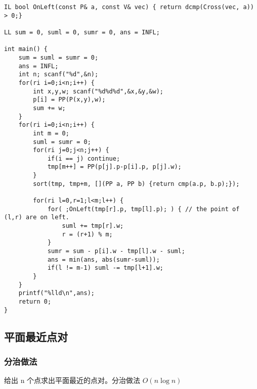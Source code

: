 \documentclass[UTF8]{ctexart}
\begin{document}
\begin{framed}
\begin{lstlisting}
IL bool OnLeft(const P& a, const V& vec) { return dcmp(Cross(vec, a)) > 0;}

LL sum = 0, suml = 0, sumr = 0, ans = INFL;

int main() {
    sum = suml = sumr = 0;
    ans = INFL;
    int n; scanf("%d",&n);
    for(ri i=0;i<n;i++) {
        int x,y,w; scanf("%d%d%d",&x,&y,&w);
        p[i] = PP(P(x,y),w);
        sum += w;
    }
    for(ri i=0;i<n;i++) {
        int m = 0;
        suml = sumr = 0;
        for(ri j=0;j<n;j++) {
            if(i == j) continue;
            tmp[m++] = PP(p[j].p-p[i].p, p[j].w);
        }
        sort(tmp, tmp+m, [](PP a, PP b) {return cmp(a.p, b.p);});

        for(ri l=0,r=1;l<m;l++) {
            for( ;OnLeft(tmp[r].p, tmp[l].p); ) { // the point of (l,r) are on left.
                suml += tmp[r].w;
                r = (r+1) % m;
            }
            sumr = sum - p[i].w - tmp[l].w - suml;
            ans = min(ans, abs(sumr-suml));
            if(l != m-1) suml -= tmp[l+1].w;
        }
    }
    printf("%lld\n",ans);
    return 0;
}
\end{lstlisting}
\end{framed}

\subsection{平面最近点对}

\subsubsection{分治做法}
给出 n 个点求出平面最近的点对。分治做法 $O(n \log n)$
\end{document}
